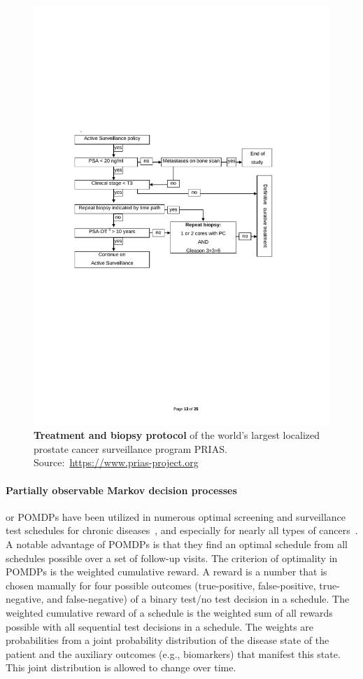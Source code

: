 \begin{figure}[tbp]
\includegraphics{contents/c1/images/c1_prias_biopsy_protocol.pdf}
\caption{\textbf{Treatment and biopsy protocol} of the world's largest localized prostate cancer surveillance program PRIAS. Source:~\url{https://www.prias-project.org}}
\label{c1:fig:c1_prias_biopsy_protocol}
\end{figure}

\paragraph{Partially observable Markov decision processes} or POMDPs have been utilized in numerous optimal screening and surveillance test schedules for chronic diseases~\citep{steimle2017markov,denton2018optimization}, and especially for nearly all types of cancers~\citep{alagoz2010operations}. A notable advantage of POMDPs is that they find an optimal schedule from all schedules possible over a set of follow-up visits. The criterion of optimality in POMDPs is the weighted cumulative reward. A reward is a number that is chosen manually for four possible outcomes (true-positive, false-positive, true-negative, and false-negative) of a binary test/no test decision in a schedule. The weighted cumulative reward of a schedule is the weighted sum of all rewards possible with all sequential test decisions in a schedule. The weights are probabilities from a joint probability distribution of the disease state of the patient and the auxiliary outcomes (e.g., biomarkers) that manifest this state. This joint distribution is allowed to change over time.

